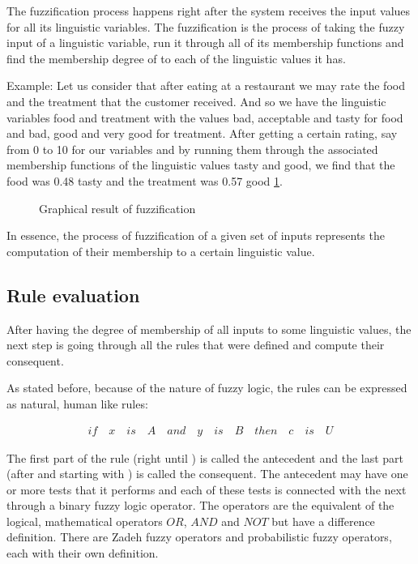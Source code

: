 \qquad The fuzzification process happens right after the system receives the input values for all its
linguistic variables. The fuzzification is the process of taking the fuzzy input of a linguistic variable,
run it through all of its membership functions and find the membership degree of to each of the linguistic
values it has.

Example: Let us consider that after eating at a restaurant we may rate the food and the treatment that the
customer received. And so we have the linguistic variables food and treatment with the values bad, acceptable
and tasty for food and bad, good and very good for treatment. After getting a certain rating, say from 0 to 10
for our variables and by running them through the associated membership functions of the linguistic values
tasty and good, we find that the food was 0.48 tasty and the treatment was 0.57 good \ref{fig:fuzzify}.

\begin{figure}[h!]
    \centerline{}
    \centerline{}
    \caption[Graphical result of fuzzification]{Graphical result of fuzzification}
\label{fig:fuzzify}
\end{figure}

\qquad In essence, the process of fuzzification of a given set of inputs represents the computation of their
membership to a certain linguistic value.


\subsection{Rule evaluation}

\qquad After having the degree of membership of all inputs to some linguistic values, the next step is going
through all the rules that were defined and compute their consequent.

\qquad As stated before, because of the nature of fuzzy logic, the rules can be expressed as natural, human
like rules:

\begin{align}
if \quad x \quad is \quad A \quad and \quad y \quad is \quad B \quad then \quad c \quad is \quad U
\end{align}

The first part of the rule (right until ) is called the antecedent and the last part (after and
starting with ) is called the consequent. The antecedent may have one or more tests that it performs
and each of these tests is connected with the next through a binary fuzzy logic operator. The operators are
the equivalent of the logical, mathematical operators $OR$, $AND$ and $NOT$ but have a difference definition.
There are Zadeh fuzzy operators and probabilistic fuzzy operators, each with their own definition.


